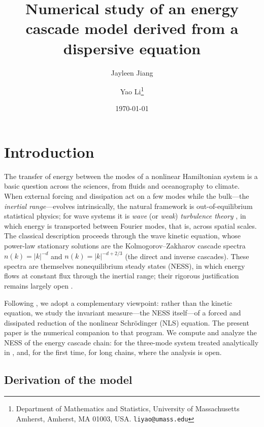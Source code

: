 \documentclass[11pt,a4paper]{article}
\title{Numerical study of an energy cascade model derived from a dispersive equation}
\author{Jayleen Jiang \and Yao Li\thanks{Department of Mathematics and Statistics, University of Massachusetts Amherst, Amherst, MA 01003, USA. \texttt{liyao@umass.edu}}}
\date{\today}
\theoremstyle{definition}
\numberwithin{equation}{section}   %
\begin{document}
\maketitle


\section{Introduction}

The transfer of energy between the modes of a nonlinear Hamiltonian system is a
basic question across the sciences, from fluids and oceanography to climate.
When external forcing and dissipation act on a few modes while the bulk---the
\emph{inertial range}---evolves intrinsically, the natural framework is
out-of-equilibrium statistical physics; for wave systems it is \emph{wave} (or
\emph{weak}) \emph{turbulence theory} \cite{Nazarenko}, in which energy is
transported between Fourier modes, that is, across spatial scales. The classical
description proceeds through the wave kinetic equation, whose power-law
stationary solutions are the Kolmogorov--Zakharov cascade spectra
$n(k)=|k|^{-d}$ and $n(k)=|k|^{-d+2/3}$ (the direct and inverse cascades). These
spectra are themselves nonequilibrium steady states (NESS), in which energy
flows at constant flux through the inertial range; their rigorous justification
remains largely open \cite{HLNS}.

Following \cite{HLNS}, we adopt a complementary viewpoint: rather than the
kinetic equation, we study the invariant measure---the NESS itself---of a
forced and dissipated reduction of the nonlinear Schr\"odinger (NLS) equation.
The present paper is the numerical companion to that program. We compute and
analyze the NESS of the energy cascade chain: for the three-mode system treated
analytically in \cite{HLNS}, and, for the first time, for long chains, where the
analysis is open.

\subsection{Derivation of the model}\label{sec:derivation}
\end{document}

